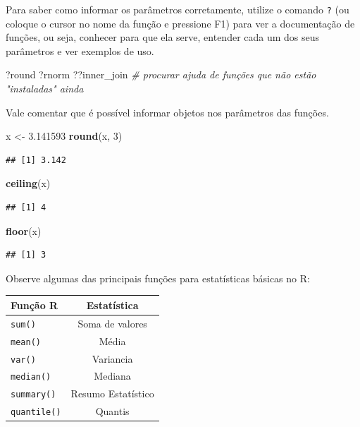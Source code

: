 \documentclass[]{book}
\newenvironment{Shaded}{\begin{snugshade}}{\end{snugshade}}
\newcommand{\KeywordTok}[1]{\textcolor[rgb]{0.13,0.29,0.53}{\textbf{#1}}}
\newcommand{\DecValTok}[1]{\textcolor[rgb]{0.00,0.00,0.81}{#1}}
\newcommand{\FloatTok}[1]{\textcolor[rgb]{0.00,0.00,0.81}{#1}}
\newcommand{\StringTok}[1]{\textcolor[rgb]{0.31,0.60,0.02}{#1}}
\newcommand{\CommentTok}[1]{\textcolor[rgb]{0.56,0.35,0.01}{\textit{#1}}}
\newcommand{\NormalTok}[1]{#1}
\begin{document}
Para saber como informar os parâmetros corretamente, utilize o comando
\texttt{?} (ou coloque o cursor no nome da função e pressione F1) para
ver a documentação de funções, ou seja, conhecer para que ela serve,
entender cada um dos seus parâmetros e ver exemplos de uso.

\begin{Shaded}
\begin{Highlighting}[]
\NormalTok{?round}
\NormalTok{?rnorm}
\NormalTok{??inner_join }\CommentTok{# procurar ajuda de funções que não estão "instaladas" ainda}
\end{Highlighting}
\end{Shaded}

Vale comentar que é possível informar objetos nos parâmetros das
funções.

\begin{Shaded}
\begin{Highlighting}[]
\NormalTok{x <-}\StringTok{ }\FloatTok{3.141593}
\KeywordTok{round}\NormalTok{(x, }\DecValTok{3}\NormalTok{)}
\end{Highlighting}
\end{Shaded}

\begin{verbatim}
## [1] 3.142
\end{verbatim}

\begin{Shaded}
\begin{Highlighting}[]
\KeywordTok{ceiling}\NormalTok{(x)}
\end{Highlighting}
\end{Shaded}

\begin{verbatim}
## [1] 4
\end{verbatim}

\begin{Shaded}
\begin{Highlighting}[]
\KeywordTok{floor}\NormalTok{(x)}
\end{Highlighting}
\end{Shaded}

\begin{verbatim}
## [1] 3
\end{verbatim}

Observe algumas das principais funções para estatísticas básicas no R:

\begin{longtable}[]{@{}lc@{}}
\toprule
Função R & Estatística\tabularnewline
\midrule
\endhead
\texttt{sum()} & Soma de valores\tabularnewline
\texttt{mean()} & Média\tabularnewline
\texttt{var()} & Variancia\tabularnewline
\texttt{median()} & Mediana\tabularnewline
\texttt{summary()} & Resumo Estatístico\tabularnewline
\texttt{quantile()} & Quantis\tabularnewline
\bottomrule
\end{longtable}
\end{document}
